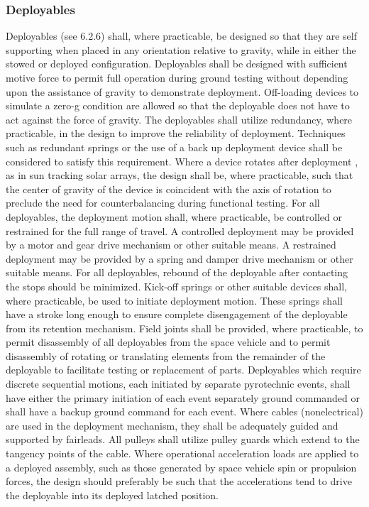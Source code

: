 \documentclass[12pt]{article}
\begin{document}
\subsubsection{Deployables} %
Deployables (see 6.2.6) shall, where practicable, be designed so that they are self supporting when placed in any orientation relative to gravity, while in either the stowed or deployed configuration. 
Deployables shall be designed with sufficient motive force to permit full operation during ground testing without depending upon the assistance of gravity to demonstrate deployment. 
Off-loading devices to simulate a zero-g condition are allowed so that the deployable does not have to act against the force of gravity. 
The deployables shall utilize redundancy, where practicable, in the design to improve the reliability of deployment. 
Techniques such as redundant springs or the use of a back up deployment device shall be considered to satisfy this requirement. 
Where a device rotates after deployment , as in sun tracking solar arrays, the design shall be, where practicable, such that the center of gravity of the device is coincident with the axis of rotation to preclude the need for counterbalancing during
functional testing. 
For all deployables, the deployment motion shall, where practicable, be controlled or restrained for the full range of travel. 
A controlled deployment may be provided by a motor and gear drive mechanism or other suitable means. 
A restrained deployment may be provided by a spring and damper drive mechanism or other suitable means. 
For all deployables, rebound of the deployable after contacting the stops should be minimized. 
Kick-off springs or other suitable devices shall, where practicable, be used to initiate deployment motion. 
These springs shall have a stroke long enough to ensure complete disengagement of the deployable from its retention mechanism.
Field joints shall be provided, where practicable, to permit disassembly of all deployables from the space vehicle and to
permit disassembly of rotating or translating elements from the remainder of the deployable to facilitate testing or replacement of parts. 
Deployables which require discrete sequential motions, each initiated by separate pyrotechnic events, shall have either the primary initiation of each event separately ground commanded or shall have a backup ground command for each event. 
Where cables (nonelectrical) are used in the deployment mechanism, they shall be adequately guided and supported by fairleads. 
All pulleys shall utilize pulley guards which extend to the tangency points of the cable. 
Where operational acceleration loads are applied to a deployed assembly, such as those generated by space vehicle spin or propulsion forces, the design should preferably be such that the accelerations tend to drive the deployable into its deployed latched position.
\end{document}
